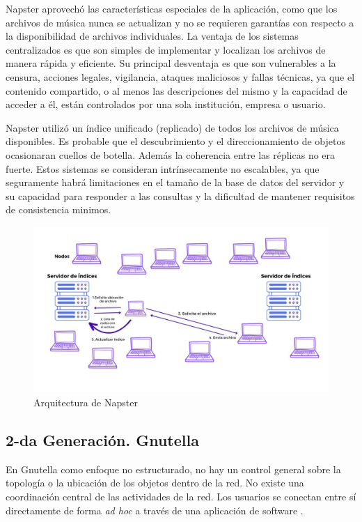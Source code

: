  Napster aprovechó las características especiales de la aplicación, como que los archivos de música nunca se actualizan y no se requieren garantías con respecto a la disponibilidad de archivos individuales.
 La ventaja de los sistemas centralizados es que son simples de implementar y localizan los archivos de manera rápida y eficiente.
 Su principal desventaja es que son vulnerables a la censura, acciones legales, vigilancia, ataques maliciosos y fallas técnicas, ya que el contenido compartido, o al menos las descripciones del mismo y la capacidad de acceder a él, están controlados por una sola institución, empresa o usuario. 
 
 Napster utilizó un índice unificado (replicado) de todos los archivos de música disponibles.  Es probable que el descubrimiento y el direccionamiento de objetos ocasionaran  cuellos de botella. 
  Adem\'as la coherencia entre las réplicas no era fuerte. Estos sistemas se consideran intrínsecamente no escalables, ya que seguramente habrá limitaciones en el tamaño de la base de datos del servidor y su capacidad para responder a las consultas y la dificultad de mantener requisitos de consistencia minimos.
 

 \begin{figure}%
 			\begin{center}
 	\includegraphics [width=0.8\linewidth]{10/1.jpg } 
 	\caption{Arquitectura de Napster}
 	\label{fig:napster}
 			\end{center}
 \end{figure}

 
 
 \subsection{2-da Generación. Gnutella}
 
  
 
 En Gnutella como enfoque no estructurado, no hay un control general sobre la topología o la ubicación de los objetos dentro de la  red. No existe una coordinación central de las actividades de la red.
 Los usuarios se conectan entre sí directamente de forma \textit{ad hoc} a través de una aplicación de software \cite{Eberspaecher2005a} \cite{Buford2009}.
 
